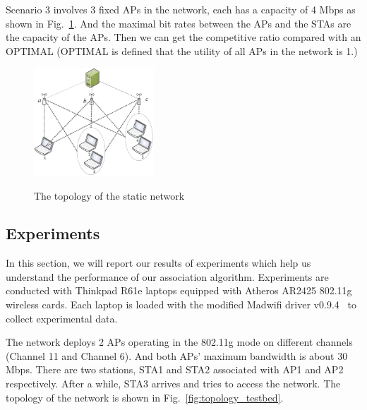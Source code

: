 \documentclass[conference]{IEEEtran}
\def\figwidth{0.4\textwidth}
\begin{document}
  Scenario 3 involves 3 fixed APs in the network, each has a capacity of 4 Mbps as shown in Fig.~\ref{fig:topology_static}.  And the maximal bit rates between the APs and the STAs are the capacity of the APs.  Then we can get the competitive ratio compared with an OPTIMAL (OPTIMAL is defined that the utility of all APs in the network is 1.)
  \begin{figure}[!ht]
    \centering
    \includegraphics[width=\figwidth]{Topology_Static.eps}\\
    \caption{The topology of the static network}\label{fig:topology_static}
  \end{figure}


  \subsection{Experiments}

  In this section, we will report our results of experiments which help us understand the performance of our association algorithm.  Experiments are conducted with Thinkpad R61e laptops equipped with Atheros AR2425 802.11g wireless cards.  Each laptop is loaded with the modified Madwifi driver v0.9.4~\cite{madwifi:09} to collect experimental data.


  The network deploys 2 APs operating in the 802.11g mode on different channels (Channel 11 and Channel 6).  And both APs' maximum bandwidth is about 30 Mbps.  There are two stations, STA1 and STA2 associated with AP1 and AP2 respectively.  After a while, STA3 arrives and tries to access the network.  The topology of the network is shown in Fig.~\ref{fig:topology_testbed}.
\end{document}
